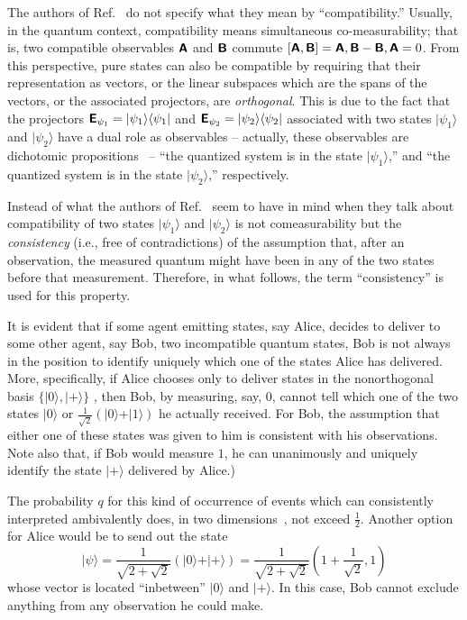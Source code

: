 \documentclass[%
 preprint,
 showpacs,
 showkeys,
 preprintnumbers,
 amsmath,amssymb,
 aps,
 pra,
  longbibliography,
 ]{revtex4-1}
\begin{document}
The authors of Ref.~\cite{Pusey-arXiv:1111.3328}
do not specify what they mean by ``compatibility.''
Usually, in the quantum context, compatibility means
simultaneous co-measurability; that is, two compatible observables
$\textsf{\textbf{A}}$
and
$\textsf{\textbf{B}}$
commute
$[\textsf{\textbf{A}},\textsf{\textbf{B}}]
=
\textsf{\textbf{A}},\textsf{\textbf{B}}
-
\textsf{\textbf{B}},\textsf{\textbf{A}} = 0$.
From this perspective, pure states can also be compatible by requiring that
their representation as vectors, or
the linear subspaces which are the spans of the vectors,
or the associated projectors,
are {\em orthogonal}.
This is due to the fact that
the projectors
$\textsf{\textbf{E}}_{\psi_1} =\vert \psi_1 \rangle \langle \psi_1 \vert $
and
$\textsf{\textbf{E}}_{\psi_2} =\vert \psi_2 \rangle \langle \psi_2 \vert $
associated with two states
$\vert \psi_1 \rangle$   and
$\vert \psi_2 \rangle$
 have a dual role as
observables -- actually, these observables are dichotomic propositions~\cite{birkhoff-36} --
``the quantized system is in the state $\vert \psi_1 \rangle$,''  and
``the quantized system is in the state $\vert \psi_2 \rangle$,'' respectively.


Instead of
what the  authors of Ref.~\cite{Pusey-arXiv:1111.3328} seem to have in mind
when they talk about compatibility of two states
$\vert \psi_1 \rangle$   and
$\vert \psi_2 \rangle$
is not comeasurability but
the {\em consistency} (i.e., free of contradictions)
of the assumption
that, after an observation,
the measured quantum might have been in any of the two states before that measurement.
Therefore, in what follows, the term  ``consistency'' is used for this property.

It is evident that if some agent emitting states, say Alice,
decides to deliver to some other agent, say Bob,
two incompatible quantum states,
Bob is not always in the position to identify uniquely which one of the states Alice has delivered.
More, specifically,
if Alice chooses only to deliver states in the nonorthogonal
basis
$\{
\vert 0 \rangle
,
\vert + \rangle
\}$
,
then Bob,
by measuring, say,
$0$,
cannot tell which one of the two states
$
\vert 0 \rangle
$
or
$
\frac{1}{\sqrt{2} }\left( \vert 0 \rangle + \vert 1 \rangle \right)
$
 he actually received.
For Bob,
the assumption that either one of these states was given to him is consistent
with his observations.
Note also
that, if Bob would measure $1$, he can unanimously and uniquely identify the state $\vert + \rangle  $
delivered by Alice.)

The probability $q$ for this kind of occurrence of
events which can consistently interpreted ambivalently
does, in two dimensions~\cite{WooFie,durt},
not exceed $\frac{1}{{2}}$.
Another option for Alice would be to send out the state
\begin{equation}
\vert \psi \rangle =\frac{1}{\sqrt{2+\sqrt{2}} }
\left( \vert 0 \rangle + \vert + \rangle \right) = \frac{1}{\sqrt{2+\sqrt{2}}  }
\left(1+\frac{1}{\sqrt{2} } ,1\right)
\end{equation}
whose vector is located ``inbetween''
$\vert 0 \rangle$ and
$\vert + \rangle$.
In this case, Bob cannot exclude anything from any observation he could make.
\end{document}
